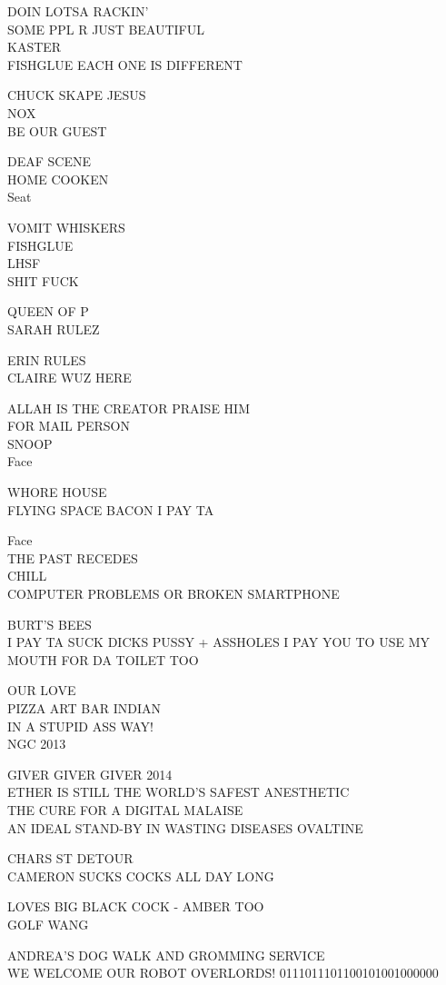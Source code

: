 \documentclass[10pt,letterpaper]{article}
\begin{document}
DOIN LOTSA RACKIN'\\
SOME PPL R JUST BEAUTIFUL\\
KASTER\\
FISHGLUE EACH ONE IS DIFFERENT

CHUCK SKAPE JESUS\\
NOX\\
BE OUR GUEST

DEAF SCENE\\
HOME COOKEN\\
Seat

VOMIT WHISKERS\\
FISHGLUE\\
LHSF\\
SHIT FUCK

QUEEN OF P\\
SARAH RULEZ

ERIN RULES\\
CLAIRE WUZ HERE

ALLAH IS THE CREATOR PRAISE HIM\\
FOR MAIL PERSON\\
SNOOP\\
Face

WHORE HOUSE\\
FLYING SPACE BACON I PAY TA

Face\\
THE PAST RECEDES\\
CHILL\\
COMPUTER PROBLEMS OR BROKEN SMARTPHONE

BURT'S BEES\\
I PAY TA SUCK DICKS PUSSY + ASSHOLES I PAY YOU TO USE MY MOUTH FOR DA TOILET TOO

OUR LOVE\\
PIZZA ART BAR INDIAN\\
IN A STUPID ASS WAY!\\
NGC 2013

GIVER GIVER GIVER 2014\\
ETHER IS STILL THE WORLD'S SAFEST ANESTHETIC\\
THE CURE FOR A DIGITAL MALAISE\\
AN IDEAL STAND{-}BY IN WASTING DISEASES OVALTINE

CHARS ST DETOUR\\
CAMERON SUCKS COCKS ALL DAY LONG

LOVES BIG BLACK COCK {-} AMBER TOO\\
GOLF WANG

ANDREA'S DOG WALK AND GROMMING SERVICE\\
WE WELCOME OUR ROBOT OVERLORDS!  0111011101100101001000000
\end{document}
